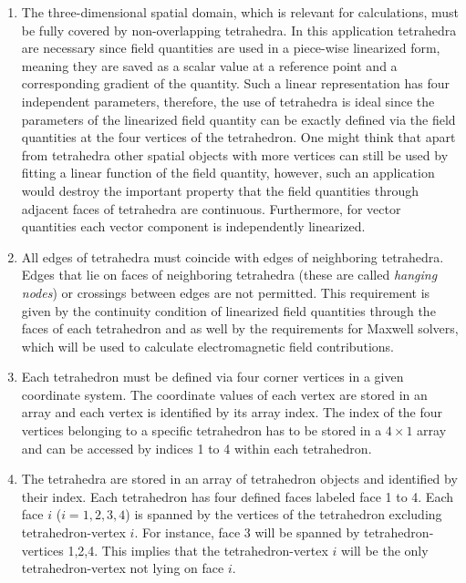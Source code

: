 \documentclass[./main.tex]{subfiles}
\begin{document}
\begin{enumerate}
	\item The three-dimensional spatial domain, which is relevant for calculations, must be fully covered by non-overlapping tetrahedra. In this application tetrahedra are necessary since field quantities are used in a piece-wise linearized form, meaning they are saved as a scalar value at a reference point and a corresponding gradient of the quantity. Such a linear representation has four independent parameters, therefore, the use of tetrahedra is ideal since the parameters of the linearized field quantity can be exactly defined via the field quantities at the four vertices of the tetrahedron. One might think that apart from tetrahedra other spatial objects with more vertices can still be used by fitting a linear function of the field quantity, however, such an application would destroy the important property that the field quantities through adjacent faces of tetrahedra are continuous.
	Furthermore, for vector quantities each vector component is independently linearized.
	
	
	\item All edges of tetrahedra must coincide with edges of neighboring tetrahedra. Edges that lie on faces of neighboring tetrahedra (these are called \textit{hanging nodes}) or crossings between edges are not permitted. This requirement is given by the continuity condition of linearized field quantities through the faces of each tetrahedron and as well by the requirements for Maxwell solvers, which will be used to calculate electromagnetic field contributions. 
	
	\item Each tetrahedron must be defined via four corner vertices in a given coordinate system. The coordinate values of each vertex are stored in an array and each vertex is identified by its array index. The index of the four vertices belonging to a specific tetrahedron has to be stored in a $4\times1$ array and can be accessed by indices 1 to 4 within each tetrahedron.
	
	\item The tetrahedra are stored in an array of tetrahedron objects and identified by their index. Each tetrahedron has four defined faces labeled face 1 to 4. Each face $i$ ($i = 1,2,3,4$) is spanned by the vertices of the tetrahedron excluding tetrahedron-vertex $i$. For instance, face 3 will be spanned by tetrahedron-vertices 1,2,4. This implies that the tetrahedron-vertex $i$ will be the only tetrahedron-vertex not lying on face $i$.
	

\end{enumerate}
\end{document}

